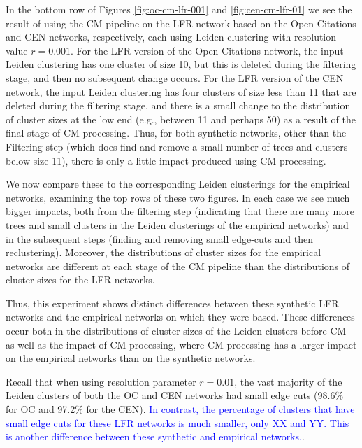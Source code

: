 \documentclass[11pt]{article}   	%
\begin{document}
In the bottom row of Figures \ref{fig:oc-cm-lfr-001} and  \ref{fig:cen-cm-lfr-01} we see the result of using the CM-pipeline on the LFR network based on the Open Citations  and CEN networks, respectively, each using Leiden clustering with
resolution value $r=0.001$.
For the LFR version of the Open Citations network, the input Leiden clustering has one cluster of size 10, but this is deleted during the filtering stage, and then no subsequent change occurs.
For the LFR version of the CEN network, the input Leiden clustering has four clusters of size less than 11 that are  deleted during the filtering stage, and there is a small change to the distribution of cluster sizes at the low end (e.g., between 11 and perhaps 50) as a result of the final stage of CM-processing.
Thus, for both synthetic networks, other than the Filtering step (which does find and remove a small number of trees and clusters below size 11), there is only a little
impact produced using CM-processing.

We now compare these to the corresponding Leiden clusterings for the empirical networks, examining the top rows of these two figures.
In each case we see much bigger impacts, both from the filtering step (indicating that there are many more  trees and small clusters in the Leiden clusterings of the empirical
networks) and in the subsequent steps (finding and removing small edge-cuts and then reclustering).
Moreover, the distributions of cluster sizes for the empirical networks are different at each stage of the CM pipeline than the distributions of cluster sizes for the LFR networks.

Thus, this experiment shows distinct differences between these synthetic LFR networks and the empirical networks on which they were based.
These differences occur both in the distributions of cluster sizes of the Leiden clusters before CM as well as the impact of CM-processing, where CM-processing has a larger impact on the empirical networks than on the synthetic networks.

Recall that when using resolution parameter $r=0.01$, the vast majority of the Leiden clusters of both the OC and CEN networks had small edge cuts (98.6\% for OC and 97.2\% for the CEN).
\textcolor{blue}{In contrast, the percentage of clusters that have small edge cuts for these LFR networks is much smaller, only XX and YY. This is another difference between these synthetic and empirical networks.}.
\end{document}
